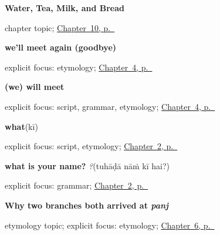 \noindent\begin{minipage}[t]{\linewidth}
\raggedright
\textbf{Water, Tea, Milk, and Bread}\par
\footnotesize chapter topic; \hyperref[ch:pa-request-food-drink]{Chapter~10, p.~\pageref*{ch:pa-request-food-drink}}
\end{minipage}\par\smallskip

\noindent\begin{minipage}[t]{\linewidth}
\raggedright
\textbf{we'll meet again (goodbye)}\enspace\emph{ }\par
\footnotesize explicit focus: etymology; \hyperref[ch:farewells]{Chapter~4, p.~\pageref*{ch:farewells}}
\end{minipage}\par\smallskip

\noindent\begin{minipage}[t]{\linewidth}
\raggedright
\textbf{(we) will meet}\enspace\emph{}\par
\footnotesize explicit focus: script, grammar, etymology; \hyperref[ch:farewells]{Chapter~4, p.~\pageref*{ch:farewells}}
\end{minipage}\par\smallskip

\noindent\begin{minipage}[t]{\linewidth}
\raggedright
\textbf{what}\enspace\emph{}\enspace(kī)\par
\footnotesize explicit focus: script, etymology; \hyperref[ch:introductions]{Chapter~2, p.~\pageref*{ch:introductions}}
\end{minipage}\par\smallskip

\noindent\begin{minipage}[t]{\linewidth}
\raggedright
\textbf{what is your name?}\enspace\emph{   ?}\enspace(tuhāḍā nāṁ kī hai?)\par
\footnotesize explicit focus: grammar; \hyperref[ch:introductions]{Chapter~2, p.~\pageref*{ch:introductions}}
\end{minipage}\par\smallskip

\noindent\begin{minipage}[t]{\linewidth}
\raggedright
\textbf{Why two branches both arrived at \emph{panj}}\par
\footnotesize etymology topic; explicit focus: etymology; \hyperref[ch:numbers-one-to-five]{Chapter~6, p.~\pageref*{ch:numbers-one-to-five}}
\end{minipage}\par\smallskip

